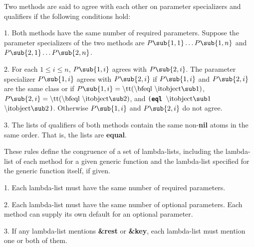 \endsubSection%


Two methods are said to agree with each other on parameter specializers
and qualifiers if the following conditions hold:

\beginlist

\item{1.} Both methods have the same number of required parameters.
Suppose the parameter specializers of the two methods are
$P\sub{1,1}\ldots P\sub{1,n}$ and $P\sub{2,1}\ldots P\sub{2,n}$.

\item{2.} For each $1\leq i\leq n$, $P\sub{1,i}$ agrees with $P\sub{2,i}$.
The parameter specializer $P\sub{1,i}$ agrees with $P\sub{2,i}$ if
$P\sub{1,i}$ and $P\sub{2,i}$ are the same class or if 
$P\sub{1,i}=\hbox{{\tt({\bf eql} $\hbox{{\it object}}\sub 1$)}}$,
$P\sub{2,i}=\hbox{{\tt({\bf eql} $\hbox{{\it object}}\sub 2$)}}$, and
{\tt ({\bf eql} $\hbox{{\it object}}\sub 1$ $\hbox{{\it object}}\sub 2$)}.
Otherwise $P\sub{1,i}$ and $P\sub{2,i}$ do not agree.

\newpage

\item{3.} The lists of qualifiers of both methods contain the same 
non-{\bf nil} atoms in the same order. That is, the lists are {\bf equal}.

\endlist

\endsubSection%


These rules define the congruence of a set of lambda-lists, including the
lambda-list of each method for a given generic function and the
lambda-list specified for the generic function itself, if given.

\beginlist

\item{1.} Each lambda-list must have the same number of required
parameters.

\item{2.} Each lambda-list must have the same number of optional
parameters.  Each method can supply its own default for an optional
parameter.

\item{3.} If any lambda-list mentions {\bf \&rest} or {\bf \&key}, each
lambda-list must mention one or both of them.

